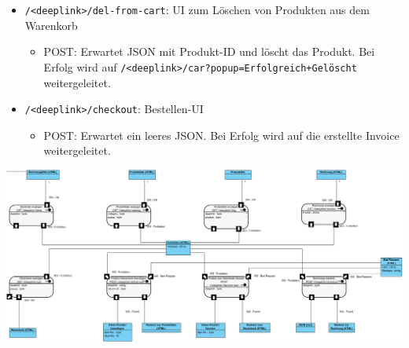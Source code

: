 \begin{itemize}
	\item \texttt{/<deeplink>/del-from-cart}: UI zum Löschen von Produkten aus dem Warenkorb
		\begin{itemize}
			\item POST: Erwartet JSON mit Produkt-ID und löscht das Produkt. Bei Erfolg wird auf \texttt{/<deeplink>/car?popup=Erfolgreich+Gelöscht} weitergeleitet.
		\end{itemize}
	\item \texttt{/<deeplink>/checkout}: Bestellen-UI
		\begin{itemize}
			\item POST: Erwartet ein leeres JSON. Bei Erfolg wird auf die erstellte Invoice weitergeleitet.
		\end{itemize}
\end{itemize}

\includegraphics[width=\textwidth]{img/api-sus}

